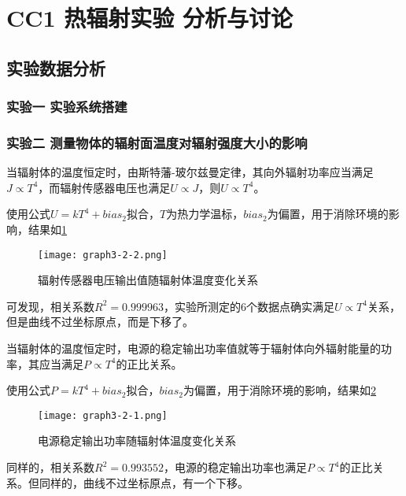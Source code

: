 \documentclass[dvipsnames, svgnames,a4paper,11pt]{article}
\begin{document}
\section{CC1 \quad 热辐射实验 \quad\heiti 分析与讨论}

\subsection{实验数据分析}

	\subsubsection{实验一 \quad 实验系统搭建}

	



	\subsubsection{实验二 \quad 测量物体的辐射面温度对辐射强度大小的影响}


	当辐射体的温度恒定时，由斯特藩-玻尔兹曼定律，其向外辐射功率应当满足$J\propto T^4$，而辐射传感器电压也满足$U\propto J$，则$U\propto T^4$。

	使用公式$U=kT^4+bias_2$拟合，$T$为热力学温标，$bias_2$为偏置，用于消除环境的影响，结果如\cref{fig:graph3-2-2}
	\begin{figure}[htbp]
		\centering
		\texttt{[image: graph3-2-2.png]}
		\caption{辐射传感器电压输出值随辐射体温度变化关系}
		\label{fig:graph3-2-2}
	\end{figure}

	可发现，相关系数$R^2=0.999963$，实验所测定的6个数据点确实满足$U\propto T^4$关系，但是曲线不过坐标原点，而是下移了。




	当辐射体的温度恒定时，电源的稳定输出功率值就等于辐射体向外辐射能量的功率，其应当满足$P\propto T^4$的正比关系。

	使用公式$P=kT^4+bias_2$拟合，$bias_2$为偏置，用于消除环境的影响，结果如\cref{fig:graph3-2-1}
	\begin{figure}[htbp]
		\centering
		\texttt{[image: graph3-2-1.png]}
		\caption{电源稳定输出功率随辐射体温度变化关系}
		\label{fig:graph3-2-1}
	\end{figure}

	同样的，相关系数$R^2=0.993552$，电源的稳定输出功率也满足$P\propto T^4$的正比关系。但同样的，曲线不过坐标原点，有一个下移。\\
\end{document}
